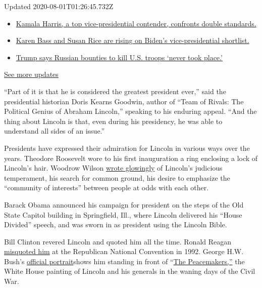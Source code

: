 Updated 2020-08-01T01:26:45.732Z

\begin{itemize}
\tightlist
\item
  \href{https://www.nytimes.com/2020/07/31/us/elections/biden-vs-trump.html?action=click\&pgtype=Article\&state=default\&region=MAIN_CONTENT_1\&context=storylines_live_updates\#link-29fdff45}{Kamala
  Harris, a top vice-presidential contender, confronts double
  standards.}
\item
  \href{https://www.nytimes.com/2020/07/31/us/elections/biden-vs-trump.html?action=click\&pgtype=Article\&state=default\&region=MAIN_CONTENT_1\&context=storylines_live_updates\#link-13ec3d9c}{Karen
  Bass and Susan Rice are rising on Biden's vice-presidential
  shortlist.}
\item
  \href{https://www.nytimes.com/2020/07/31/us/elections/biden-vs-trump.html?action=click\&pgtype=Article\&state=default\&region=MAIN_CONTENT_1\&context=storylines_live_updates\#link-49e9a016}{Trump
  says Russian bounties to kill U.S. troops `never took place.'}
\end{itemize}

\href{https://www.nytimes.com/2020/07/31/us/elections/biden-vs-trump.html?action=click\&pgtype=Article\&state=default\&region=MAIN_CONTENT_1\&context=storylines_live_updates}{See
more updates}

``Part of it is that he is considered the greatest president ever,''
said the presidential historian Doris Kearns Goodwin, author of ``Team
of Rivals: The Political Genius of Abraham Lincoln,'' speaking to his
enduring appeal. ``And the thing about Lincoln is that, even during his
presidency, he was able to understand all sides of an issue.''

Presidents have expressed their admiration for Lincoln in various ways
over the years. Theodore Roosevelt wore to his first inauguration a ring
enclosing a lock of Lincoln's hair. Woodrow Wilson
\href{https://www.uis.edu/wepner/wp-content/uploads/sites/97/2013/04/2010skowronek.pdf}{wrote
glowingly} of Lincoln's judicious temperament, his search for common
ground, his desire to emphasize the ``community of interests'' between
people at odds with each other.

Barack Obama announced his campaign for president on the steps of the
Old State Capitol building in Springfield, Ill., where Lincoln delivered
his ``House Divided'' speech, and was sworn in as president using the
Lincoln Bible.

Bill Clinton revered Lincoln and quoted him all the time. Ronald Reagan
\href{https://www.nytimes.com/1992/08/19/news/republicans-in-houston-for-the-record-reagan-put-words-in-lincoln-s-mouth.html}{misquoted
him} at the Republican National Convention in 1992. George H.W. Bush's
\href{https://www.whitehousehistory.org/photos/george-h-w-bush}{official
portrait}shows him standing in front of
``\href{https://www.whitehousehistory.org/photos/treasures-of-the-white-house-the-peacemakers}{The
Peacemakers,''} the White House painting of Lincoln and his generals in
the waning days of the Civil War.

